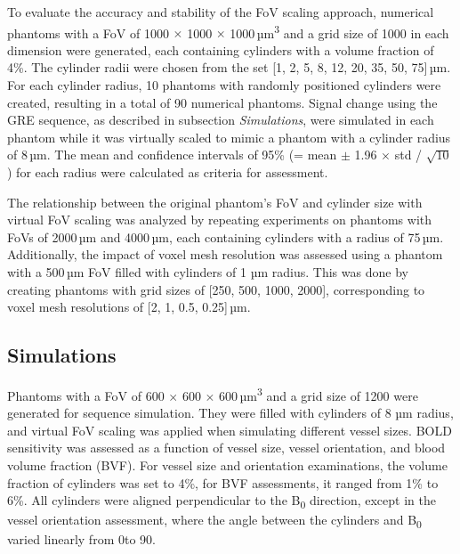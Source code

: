 To evaluate the accuracy and stability of the FoV scaling approach, numerical phantoms with a FoV of 1000 \(\times\) 1000 \(\times\) 1000\,µm\textsuperscript{3} and a grid size of 1000 in each dimension were generated, each containing cylinders with a volume fraction of 4\%. The cylinder radii were chosen from the set [1, 2, 5, 8, 12, 20, 35, 50, 75]\,µm. For each cylinder radius, 10 phantoms with randomly positioned cylinders were created, resulting in a total of 90 numerical phantoms. Signal change using the GRE sequence, as described in subsection \textit{Simulations}, were simulated in each phantom while it was virtually scaled to mimic a phantom with a cylinder radius of 8\,µm. The mean and confidence intervals of 95\% (= mean $\pm$ 1.96 $\times$ std / $\sqrt{\text{10}} $) for each radius were calculated as criteria for assessment.

 The relationship between the original phantom's FoV and cylinder size with virtual FoV scaling was analyzed by repeating experiments on phantoms with FoVs of 2000\,µm and 4000\,µm, each containing cylinders with a radius of 75\,µm. Additionally, the impact of voxel mesh resolution was assessed using a phantom with a 500\,µm FoV filled with cylinders of 1 µm radius. This was done by creating phantoms with grid sizes of [250, 500, 1000, 2000], corresponding to voxel mesh resolutions of [2, 1, 0.5, 0.25]\,µm.

\subsection*{Simulations}
\label{subsec:Simulations}

Phantoms with a FoV of 600 \(\times\) 600 \(\times\) 600\,µm\textsuperscript{3} and a grid size of 1200 were generated for sequence simulation. They were filled with cylinders of 8 µm radius, and virtual FoV scaling was applied when simulating different vessel sizes. BOLD sensitivity was assessed as a function of vessel size, vessel orientation, and blood volume fraction (BVF). For vessel size and orientation examinations, the volume fraction of cylinders was set to 4\%, for BVF assessments, it ranged from 1\% to 6\%. All cylinders were aligned perpendicular to the B\textsubscript{0} direction, except in the vessel orientation assessment, where the angle between the cylinders and B\textsubscript{0} varied linearly from 0\textdegree to 90\textdegree.


